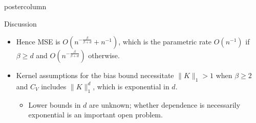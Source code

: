 \documentclass[final,hyperref={pdfpagelabels=false}]{beamer}
\newcommand{\inv}{^{-1}}
\newcommand{\X}{\mathcal{X}}
\newcommand{\Y}{\mathcal{Y}}
\newcommand{\Z}{\mathcal{Z}}
\begin{document}
\begin{frame}
\begin{columns}
\begin{column}{.32\textwidth}
\begin{beamercolorbox}[center,wd=\textwidth]{postercolumn}
\begin{minipage}[T]{.95\textwidth}
{\begin{block}{Discussion}
\begin{itemize}
\begin{itemize}
                              bound is
                              $O\left( n^{-\frac{\beta}{\beta + d}} \right)$.
                        \end{itemize}
                  \item Hence MSE is $O(n^{-\frac{\beta}{\beta + d}} + n\inv)$,
                        which is the parametric rate $O(n\inv)$ if
                        $\beta \geq d$ and $O(n^{-\frac{\beta}{\beta + d}})$
                        otherwise.
                  \item Kernel assumptions for the bias bound necessitate
                        $\|K\|_1 > 1$ when $\beta \geq 2$ and $C_V$ includes
                        $\|K\|_1^d$, which is exponential in $d$.
                        \begin{itemize}
                        \item Lower bounds in $d$ are unknown; whether
                        dependence is necessarily exponential is an important
                        open problem.
                        \end{itemize}
                  \end{itemize}
            \end{block}
            \vfill
}
\end{minipage}
\end{beamercolorbox}
\end{column}
\end{columns}
\end{frame}
\end{document}
